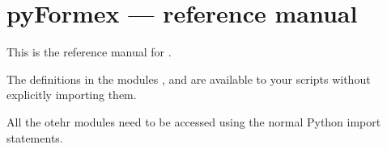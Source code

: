 
\chapter{pyFormex --- reference manual}
\label{cha:reference}

This is the reference manual for \pyformex.


The definitions in the modules ,  and  are available to your \pyformex scripts without explicitly importing them.

All the otehr modules need to be accessed using the normal Python import statements.







